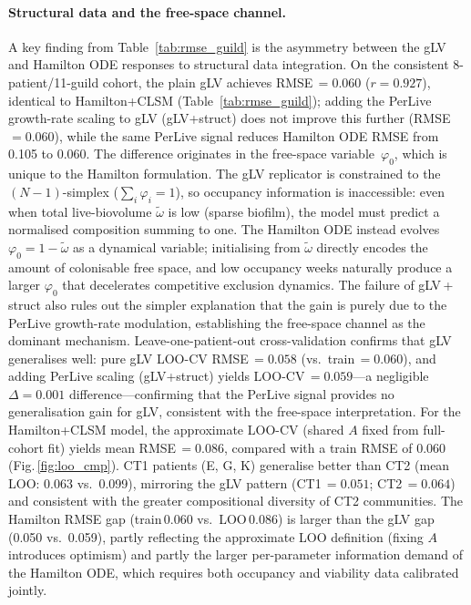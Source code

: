 \documentclass[11pt,a4paper]{article}
\begin{document}
\paragraph{Structural data and the free-space channel.}
A key finding from Table~\ref{tab:rmse_guild} is the asymmetry between the gLV and Hamilton ODE responses to structural data integration.
On the consistent 8-patient/11-guild cohort, the plain gLV achieves RMSE\,$=0.060$ ($r=0.927$), identical to Hamilton+CLSM (Table~\ref{tab:rmse_guild}); adding the PerLive growth-rate scaling to gLV (gLV+struct) does not improve this further (RMSE\,$=0.060$), while the same PerLive signal reduces Hamilton ODE RMSE from 0.105 to 0.060.
The difference originates in the free-space variable~$\varphi_0$, which is unique to the Hamilton formulation.
The gLV replicator is constrained to the $(N-1)$-simplex ($\sum_i\varphi_i = 1$), so occupancy information is inaccessible: even when total live-biovolume $\tilde\omega$ is low (sparse biofilm), the model must predict a normalised composition summing to one.
The Hamilton ODE instead evolves $\varphi_0 = 1 - \tilde\omega$ as a dynamical variable; initialising from $\tilde\omega$ directly encodes the amount of colonisable free space, and low occupancy weeks naturally produce a larger $\varphi_0$ that decelerates competitive exclusion dynamics.
The failure of gLV\,+\,struct also rules out the simpler explanation that the gain is purely due to the PerLive growth-rate modulation, establishing the free-space channel as the dominant mechanism.
Leave-one-patient-out cross-validation confirms that gLV generalises well: pure gLV LOO-CV RMSE\,$= 0.058$ (vs.\ train\,$= 0.060$), and adding PerLive scaling (gLV+struct) yields LOO-CV\,$= 0.059$---a negligible $\Delta = 0.001$ difference---confirming that the PerLive signal provides no generalisation gain for gLV, consistent with the free-space interpretation.
For the Hamilton+CLSM model, the approximate LOO-CV (shared $A$ fixed from full-cohort fit) yields mean RMSE\,$= 0.086$, compared with a train RMSE of 0.060 (Fig.\,\ref{fig:loo_cmp}).
CT1 patients (E, G, K) generalise better than CT2 (mean LOO: 0.063 vs.\ 0.099), mirroring the gLV pattern (CT1\,$= 0.051$; CT2\,$= 0.064$) and consistent with the greater compositional diversity of CT2 communities.
The Hamilton RMSE gap (train\,0.060 vs.\ LOO\,0.086) is larger than the gLV gap (0.050 vs.\ 0.059), partly reflecting the approximate LOO definition (fixing $A$ introduces optimism) and partly the larger per-parameter information demand of the Hamilton ODE, which requires both occupancy and viability data calibrated jointly.
\end{document}
